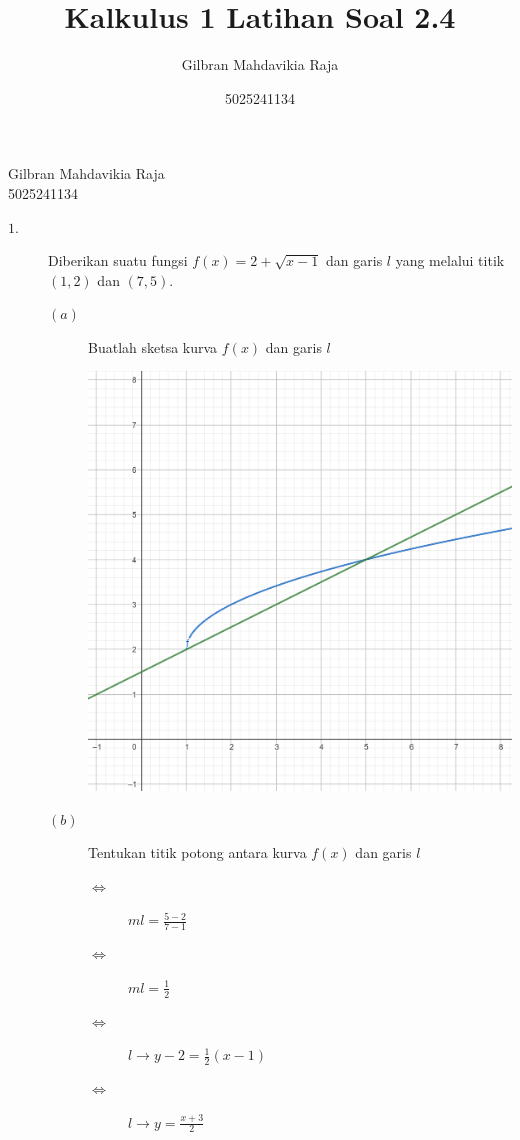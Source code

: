 \documentclass{article}
\title{Kalkulus 1 Latihan Soal 2.4}
\author{Gilbran Mahdavikia Raja}
\date{5025241134}
\begin{document}
\begin{flushleft}
    Gilbran Mahdavikia Raja \\
    5025241134 \\
\end{flushleft}
\begin{description}
    \item[$1.$] Diberikan suatu fungsi $f(x)=2+\sqrt{x-1}$ dan garis $l$ yang melalui titik $(1,2)$ dan $(7,5)$. 
    \begin{description}
        \item[$(a)$] Buatlah sketsa kurva $f(x)$ dan garis $l$
        \item[] \begin{enumerate} \includegraphics[scale=0.17]{1.png}\end{enumerate}
        \item[$(b)$] Tentukan titik potong antara kurva $f(x)$ dan garis $l$ 
        \begin{description}
            \item[$\Leftrightarrow$] $ml = \frac{5-2}{7-1}$
            \item[$\Leftrightarrow$] $ml = \frac{1}{2}$
            \item[$\Leftrightarrow$] $l \rightarrow y-2=\frac{1}{2}(x-1)$
            \item[$\Leftrightarrow$] $l \rightarrow y=\frac{x+3}{2}$

\end{description}
\end{description}
\end{description}
\end{document}
